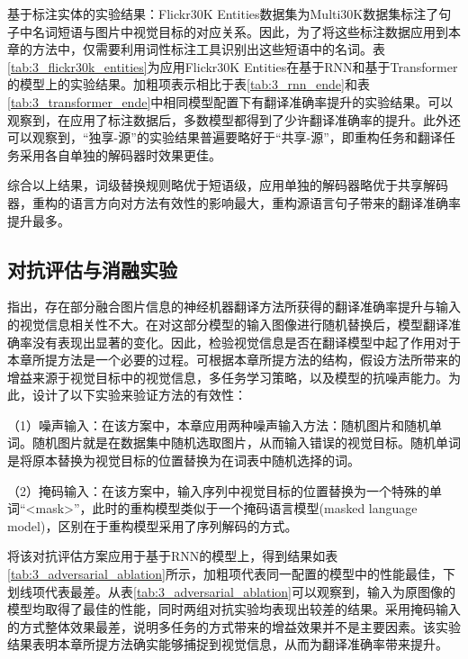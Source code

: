 
{\sffamily 基于标注实体的实验结果：}Flickr30K Entities数据集为Multi30K数据集标注了句子中名词短语与图片中视觉目标的对应关系。因此，为了将这些标注数据应用到本章的方法中，仅需要利用词性标注工具识别出这些短语中的名词。表\ref{tab:3_flickr30k_entities}为应用Flickr30K Entities在基于RNN和基于Transformer的模型上的实验结果。加粗项表示相比于表\ref{tab:3_rnn_ende}和表\ref{tab:3_transformer_ende}中相同模型配置下有翻译准确率提升的实验结果。可以观察到，在应用了标注数据后，多数模型都得到了少许翻译准确率的提升。此外还可以观察到，“独享-源”的实验结果普遍要略好于“共享-源”，即重构任务和翻译任务采用各自单独的解码器时效果更佳。

综合以上结果，词级替换规则略优于短语级，应用单独的解码器略优于共享解码器，重构的语言方向对方法有效性的影响最大，重构源语言句子带来的翻译准确率提升最多。

\subsection{对抗评估与消融实验}
\label{sec:3_adversarial_ablation}


指出，存在部分融合图片信息的神经机器翻译方法所获得的翻译准确率提升与输入的视觉信息相关性不大。在对这部分模型的输入图像进行随机替换后，模型翻译准确率没有表现出显著的变化。因此，检验视觉信息是否在翻译模型中起了作用对于本章所提方法是一个必要的过程。可根据本章所提方法的结构，假设方法所带来的增益来源于视觉目标中的视觉信息，多任务学习策略，以及模型的抗噪声能力。为此，设计了以下实验来验证方法的有效性：

（1）{\sffamily 噪声输入：}在该方案中，本章应用两种噪声输入方法：随机图片和随机单词。随机图片就是在数据集中随机选取图片，从而输入错误的视觉目标。随机单词是将原本替换为视觉目标的位置替换为在词表中随机选择的词。

（2）{\sffamily 掩码输入：}在该方案中，输入序列中视觉目标的位置替换为一个特殊的单词“<mask>”，此时的重构模型类似于一个掩码语言模型(masked language model)，区别在于重构模型采用了序列解码的方式。

将该对抗评估方案应用于基于RNN的模型上，得到结果如表\ref{tab:3_adversarial_ablation}所示，加粗项代表同一配置的模型中的性能最佳，下划线项代表最差。从表\ref{tab:3_adversarial_ablation}可以观察到，输入为原图像的模型均取得了最佳的性能，同时两组对抗实验均表现出较差的结果。采用掩码输入的方式整体效果最差，说明多任务的方式带来的增益效果并不是主要因素。该实验结果表明本章所提方法确实能够捕捉到视觉信息，从而为翻译准确率带来提升。

